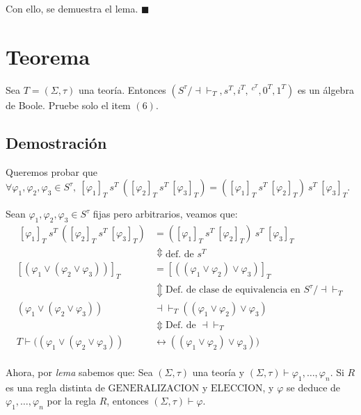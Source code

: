 \documentclass{article}
\begin{document}
Con ello, se demuestra el lema. $\blacksquare$

\section*{Teorema}
Sea $T=(\Sigma,\tau)$ una teoría. Entonces $(S^\tau/\dashv\vdash_T,s^T,i^T,\ ^{c^T},0^T,1^T)$ es un álgebra de Boole.
\newline
Pruebe solo el item $(6)$.
\subsection*{Demostración}
Queremos probar que $\forall\varphi_1,\varphi_2,\varphi_3\in S^\tau,\ [\varphi_1]_T\ s^T\ ([\varphi_2]_T\ s^T\ [\varphi_3]_T)=([\varphi_1]_T\ s^T\ [\varphi_2]_T)\ s^T\ [\varphi_3]_T$.

Sean $\varphi_1,\varphi_2,\varphi_3\in S^\tau$ fijas pero arbitrarios, veamos que:
\begin{equation*}
  \begin{aligned}
    \ [\varphi_1]_T\ s^T\ ([\varphi_2]_T\ s^T\ [\varphi_3]_T) & =([\varphi_1]_T\ s^T\ [\varphi_2]_T)\ s^T\ [\varphi_3]_T                  \\
                                                              & \Updownarrow\text{def. de }s^T                                            \\
    [(\varphi_1\lor(\varphi_2\lor\varphi_3))]_T               & =[((\varphi_1\lor\varphi_2)\lor\varphi_3)]_T                              \\
                                                              & \Updownarrow\text{Def. de clase de equivalencia en }S^\tau/\dashv\vdash_T \\
    (\varphi_1\lor(\varphi_2\lor\varphi_3))                   & \dashv\vdash_T((\varphi_1\lor\varphi_2)\lor\varphi_3)                     \\
                                                              & \Updownarrow\text{Def. de }\dashv\vdash_T                                 \\
    T\vdash((\varphi_1\lor(\varphi_2\lor\varphi_3))           & \leftrightarrow((\varphi_1\lor\varphi_2)\lor\varphi_3))                   \\
  \end{aligned}
\end{equation*}

Ahora, por \textit{lema} sabemos que: Sea $(\Sigma,\tau)$ una teoría y $(\Sigma,\tau)\vdash\varphi_1,\dots,\varphi_n$. Si $R$ es una regla distinta de $\text{GENERALIZACION}$ y $\text{ELECCION}$, y $\varphi$ se deduce de $\varphi_1,\dots,\varphi_n$ por la regla $R$, entonces $(\Sigma,\tau)\vdash\varphi$.
\end{document}

